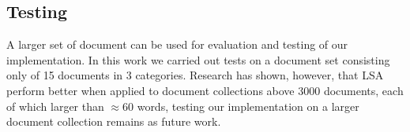\subsection{Testing}
A larger set of document can be used for evaluation and testing of our implementation. In this work we carried out tests on a document set consisting only of 15 documents in 3 categories. Research has shown, however, that \gls{LSA} perform better when applied to document collections above 3000 documents, each of which larger than $\approx 60$ words, testing our implementation on a larger document collection remains as future work. \\

